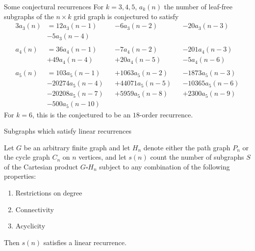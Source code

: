 \documentclass{beamer}%
\begin{document}
\begin{frame}{Some conjectural recurrences}
  For $k = 3, 4, 5$, $a_k(n)$ the number of leaf-free subgraphs of the $n \times k$
  grid graph is conjectured to satisfy
  \begin{alignat*}{3}
     a_3(n) &= 12a_3(n-1)  &&-     6a_3(n-2) &&-    20a_3(n-3) \\
           &-  5a_3(n-4)  && &&
    \\~\\
    a_4(n) &= 36a_4(n-1)  &&-     7a_4(n-2) &&-   201a_4(n-3) \\
           &+ 49a_4(n-4)  &&+    20a_4(n-5) &&-     5a_4(n-6) \\
    \\
    a_5(n) &=   103a_5(n-1) &&+  1063a_5(n-2) &&-  1873a_5(n-3) \\
           &- 20274a_5(n-4) &&+ 44071a_5(n-5) &&- 10365a_5(n-6) \\
           &- 20208a_5(n-7) &&+ 5959a_5(n-8)  &&+  2300a_5(n-9) \\
           &- 500a_5(n-10)  &&                &&
  \end{alignat*}
  For $k = 6$, this is the conjectured to be an $18$-order recurrence.
\end{frame}

\begin{frame}{Subgraphs which satisfy linear recurrences}
  
  \begin{theorem}[Faase, 1994] %
    Let $G$ be an arbitrary finite graph and let $H_n$ denote either the path
    graph $P_n$ or the cycle graph $C_n$ on $n$ vertices, and let $s(n)$
    count the number of subgraphs $S$ of the Cartesian product $G \square H_n$
    subject to any combination of the following properties:
    \begin{enumerate}
      \item Restrictions on degree
      \item Connectivity
      \item Acyclicity
    \end{enumerate}
    Then $s(n)$ satisfies a linear recurrence.
  \end{theorem}
\end{frame}
\end{document}

